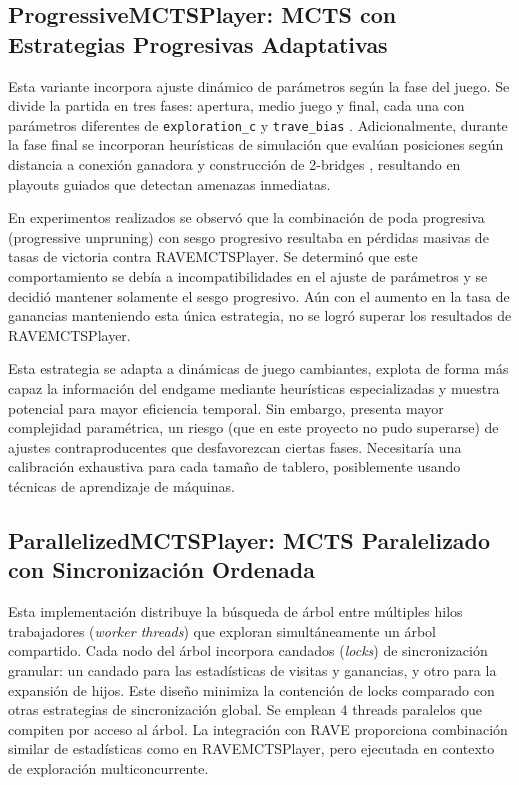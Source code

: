 \documentclass[12pt]{article}
\begin{document}
\subsection{ProgressiveMCTSPlayer: MCTS con Estrategias Progresivas Adaptativas}

Esta variante incorpora ajuste dinámico de parámetros según la fase del juego. Se divide la partida en tres fases: apertura, medio juego y final, cada una con parámetros diferentes de \texttt{exploration\_c} y \texttt{trave\_bias} \cite{Chaslot2008}. Adicionalmente, durante la fase final se incorporan heurísticas de simulación que evalúan posiciones según distancia a conexión ganadora y construcción de 2-bridges \cite{Kuncarova2024} \cite{Arneson2010}, resultando en playouts guiados que detectan amenazas inmediatas.

En experimentos realizados se observó que la combinación de poda progresiva (progressive unpruning) con sesgo progresivo resultaba en pérdidas masivas de tasas de victoria contra RAVEMCTSPlayer. Se determinó que este comportamiento se debía a incompatibilidades en el ajuste de parámetros y se decidió mantener solamente el sesgo progresivo. Aún con el aumento en la tasa de ganancias manteniendo esta única estrategia, no se logró superar los resultados de RAVEMCTSPlayer.

Esta estrategia se adapta a dinámicas de juego cambiantes, explota de forma más capaz la información del endgame mediante heurísticas especializadas y muestra potencial para mayor eficiencia temporal. Sin embargo, presenta mayor complejidad paramétrica, un riesgo (que en este proyecto no pudo superarse) de ajustes contraproducentes que desfavorezcan ciertas fases. Necesitaría una calibración exhaustiva para cada tamaño de tablero, posiblemente usando técnicas de aprendizaje de máquinas.

\subsection{ParallelizedMCTSPlayer: MCTS Paralelizado con Sincronización Ordenada}

Esta implementación distribuye la búsqueda de árbol entre múltiples hilos trabajadores (\textit{worker threads}) que exploran simultáneamente un árbol compartido. Cada nodo del árbol incorpora candados (\textit{locks}) de sincronización granular: un candado para las estadísticas de visitas y ganancias, y otro para la expansión de hijos. Este diseño minimiza la contención de locks comparado con otras estrategias de sincronización global. Se emplean $4$ threads paralelos que compiten por acceso al árbol. La integración con RAVE proporciona combinación similar de estadísticas como en RAVEMCTSPlayer, pero ejecutada en contexto de exploración multiconcurrente.
\end{document}
